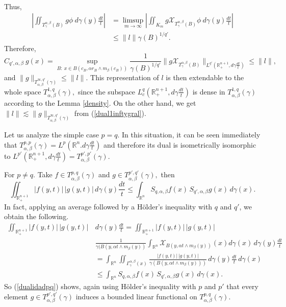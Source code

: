 \documentclass[leqno,11pt]{amsart}
\theoremstyle{plain}
\theoremstyle{remark}
\begin{document}
{\begin{align*}
\end{align*}
Thus, \begin{align*}
\left|\iint_{T^{\alpha, \beta}_\gamma(B)}g \phi\ d\gamma(y)\frac{dt}{t}\right|&=\limsup_{m\to \infty}\left|\iint_{K_m} g \mathcal{X}_{T^{\alpha, \beta}_\gamma(B)} \phi\ d\gamma(y)\frac{dt}{t}\right|\\ & \le \|l\|\gamma(B)^{1/q'}.
\end{align*}
Therefore, $$C_{q', \alpha, \beta}\ g(x)=\sup_{B:\ x\in B(c_B, \alpha r_B\wedge m_\beta (c_B))}\frac{1}{\gamma(B)^{1/q'}}\|g\mathcal{X}_{T^{\alpha,\beta}_\gamma(B)}\|_{L^{q'}(\mathbb{R}^{n+1}_+, d\gamma \frac{dt}{t})}\le \|l\|,$$ and $\|g\|_{T^{\infty,q'}_{\alpha, \beta}(\gamma)}\le \|l\|.$ This representation of $l$ is then extendable to the whole space $T^{1,q}_{\alpha, \beta}(\gamma),$ since the subspace $ L^q_{c}(\mathbb{R}^{n+1}_+, d\gamma\frac{dt}{t})$ is dense in $T^{1,q}_{\alpha, \beta}(\gamma)$ according to the Lemma \ref{density}.
On the other hand, we get $\|l\|\lesssim \|g\|_{T^{\infty,q'}_{\alpha, \beta}(\gamma)}$ from (\ref{dual1inftygral}).

 Let us analyze the simple case $p=q.$ In this situation, it can be seen immediately that $T^{p,p}_{\alpha, \beta}(\gamma)=L^{p}(\mathbb{R}^n. d\gamma\frac{dt}{t})$ and therefore its dual is isometrically isomorphic to $L^{p'}(\mathbb{R}^{n+1}_+, d\gamma\frac{dt}{t})=T^{p',p'}_{\alpha,\beta}(\gamma).$

For $p\ne q.$ Take $f\in T^{p,q}_{\alpha, \beta}(\gamma)$ and $g\in T^{p',q'}_{\alpha, \beta}(\gamma),$ then
\begin{equation}\label{dualidadpq}
\iint_{\mathbb{R}^{n+1}_+}|f(y,t)|\, |g(y,t)|\, d\gamma(y)\frac{dt}{t}\le \int_{\mathbb{R}^n}S_{q,\alpha, \beta}f(x)\, S_{q',\alpha, \beta}g(x)\, d\gamma(x).
\end{equation}
In fact, applying an average followed by a H\"older's inequality with $q$ and $q'$, we obtain the following.
\begin{align*}
\iint_{\mathbb{R}^{n+1}_+}|f(y,t)|\, |g(y,t)|\,& d\gamma(y)\frac{dt}{t}= \iint_{\mathbb{R}^{n+1}_+}|f(y,t)|\, |g(y,t)|\, \\ &\frac{1}{\gamma(B(y, \alpha t\wedge m_\beta(y))}\int_{\mathbb{R}^n}\mathcal{X}_{B(y, \alpha t\wedge m_\beta (y))}(x)d\gamma(x)\, d\gamma(y)\frac{dt}{t}\\ & =\int_{\mathbb{R}^n}\iint_{\Gamma^{\alpha, \beta}_\gamma(x)}\frac{|f(y,t)|\, |g(y,t)|}{\gamma(B(y, \alpha t \wedge m_\beta (y)))}\, d\gamma(y)\frac{dt}{t}\, d\gamma(x)\\ &\le \int_{\mathbb{R}^n}S_{q, \alpha, \beta}f(x)\, S_{q',\alpha, \beta}g(x)\, d\gamma(x).
\end{align*}
So (\ref{dualidadpq}) shows, again using H\"older's inequality with $p$ and $p'$ that every element $g\in T^{p',q'}_{\alpha, \beta}(\gamma)$ induces a bounded linear functional on $T^{p,q}_{\alpha, \beta}(\gamma).$
 

}
\end{document}

